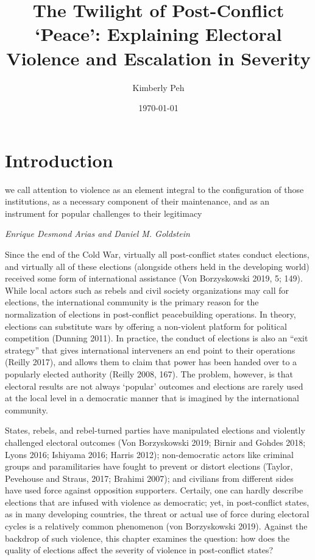 \documentclass [11pt]{article}
\title{The Twilight of Post-Conflict `Peace': Explaining Electoral Violence and Escalation in Severity}
\author{Kimberly Peh}
\date{\today}
\begin{document}
\maketitle

\section*{Introduction} %

\epigraph{we call attention to violence as an element integral to the configuration of those institutions, as a necessary component of their maintenance, and as an instrument for popular challenges to their legitimacy}{\emph{Enrique Desmond Arias and Daniel M. Goldstein}} %

Since the end of the Cold War, virtually all post-conflict states conduct elections, and virtually all of these elections (alongside others held in the developing world) received some form of international assistance (Von Borzyskowski 2019, 5; 149). While local actors such as rebels and civil society organizations may call for elections, the international community is the primary reason for the normalization of elections in post-conflict peacebuilding operations. In theory, elections can substitute wars by offering a non-violent platform for political competition (Dunning 2011). In practice, the conduct of elections is also an ``exit strategy'' that gives international interveners an end point to their operations (Reilly 2017), and allows them to claim that power has been handed over to a popularly elected authority (Reilly 2008, 167). The problem, however, is that electoral results are not always `popular' outcomes and elections are rarely used at the local level in a democratic manner that is imagined by the international community.

States, rebels, and rebel-turned parties have manipulated elections and violently challenged electoral outcomes (Von Borzyskowski 2019; Birnir and Gohdes 2018; Lyons 2016; Ishiyama 2016; Harris 2012); non-democratic actors like criminal groups and paramilitaries have fought to prevent or distort elections (Taylor, Pevehouse and Straus, 2017; Brahimi 2007); and civilians from different sides have used force against opposition supporters. Certaily, one can hardly describe elections that are infused with violence as democratic; yet, in post-conflict states, as in many developing countries, the threat or actual use of force during electoral cycles is a relatively common phenomenon (von Borzyskowski 2019). Against the backdrop of such violence, this chapter examines the question: how does the quality of elections affect the severity of violence in post-conflict states?
\end{document}
